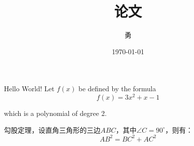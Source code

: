 \documentclass{ctexart}
\title{\heiti 论文}
\author{\kaishu 勇}
\date{\today}
\newcommand\degree{^\circ}
\begin{document}
	\maketitle
	
	Hello World!
	Let $f(x)$ be defined by the formula $$f(x)=3x^2+x-1$$ 
	
	which is a polynomial of degree 2.
	
	勾股定理，设直角三角形的三边$ABC$，其中$\angle C=90 \degree$，则有：
	\begin{equation}
		AB^2 = BC^2 + AC^2
	\end{equation}
	
	
\end{document}
